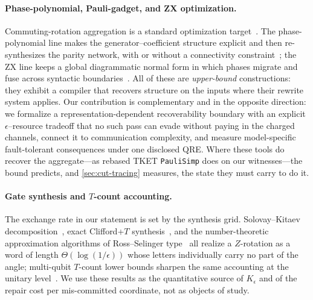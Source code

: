 \documentclass[aps,prx,reprint,floatfix,superscriptaddress]{revtex4-2}
\begin{document}
\paragraph{Phase-polynomial, Pauli-gadget, and ZX optimization.}
Commuting-rotation aggregation is a standard optimization
target~\cite{amy2014tdepth,nam2018automated,ross2016optimal,cowtan2020phase,sivarajah2021tket,duncan2020graph,kissinger2020reducing,kissinger2020pyzx}.
The phase-polynomial line makes the generator--coefficient structure
explicit and then re-synthesizes the parity network, with or without a
connectivity
constraint~\cite{amy2019cnot,beaudrap2020techniques,meijer2023architecture};
the ZX line keeps a global diagrammatic normal form in which phases
migrate and fuse across syntactic
boundaries~\cite{vandewetering2020zx,kissinger2022simulating}.  All of
these are \emph{upper-bound} constructions: they exhibit a compiler that
recovers structure on the inputs where their rewrite system applies.
Our contribution is complementary and in the opposite direction: we
formalize a representation-dependent recoverability boundary with an
explicit $\epsilon$--resource tradeoff that no such pass can evade
without paying in the charged channels, connect it to communication
complexity, and measure model-specific fault-tolerant consequences under
one disclosed QRE.  Where these tools do recover the aggregate---as
rebased TKET \texttt{PauliSimp} does on our witnesses---the bound
predicts, and \cref{sec:cut-tracing} measures, the state they must carry
to do it.

\paragraph{Gate synthesis and $T$-count accounting.}
The exchange rate in our statement is set by the synthesis grid.
Solovay--Kitaev decomposition~\cite{dawson2006solovay}, exact Clifford+$T$
synthesis~\cite{kliuchnikov2013fast}, and the number-theoretic
approximation algorithms of Ross--Selinger
type~\cite{ross2016optimal,selinger2015efficient} all realize a
$Z$-rotation as a word of length $\Theta(\log(1/\epsilon))$ whose letters
individually carry no part of the angle; multi-qubit $T$-count lower
bounds sharpen the same accounting at the unitary
level~\cite{gheorghiu2022tcount}.  We use these results as the
quantitative source of $K_\epsilon$ and of the repair cost per
mis-committed coordinate, not as objects of study.
\end{document}
